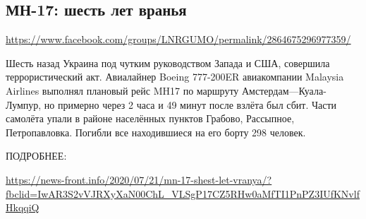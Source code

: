  
 
\subsection{МН-17: шесть лет вранья}
\label{sec:21_07_2020.fb.lnr.10}
\url{https://www.facebook.com/groups/LNRGUMO/permalink/2864675296977359/}
  
 
Шесть назад Украина под чутким руководством Запада и США, совершила
террористический акт.  Авиалайнер Boeing 777-200ER авиакомпании Malaysia
Airlines выполнял плановый рейс MH17 по маршруту Амстердам—Куала-Лумпур, но
примерно через 2 часа и 49 минут после взлёта был сбит.  Части самолёта упали в
районе населённых пунктов Грабово, Рассыпное, Петропавловка.  Погибли все
находившиеся на его борту 298 человек.

ПОДРОБНЕЕ:

\url{https://news-front.info/2020/07/21/mn-17-shest-let-vranya/?fbclid=IwAR3S2vVJRXyXaN00ChL_VLSgP17CZ5RHw0aMfTI1PnPZ3IUfKNvlfHkqqiQ}
